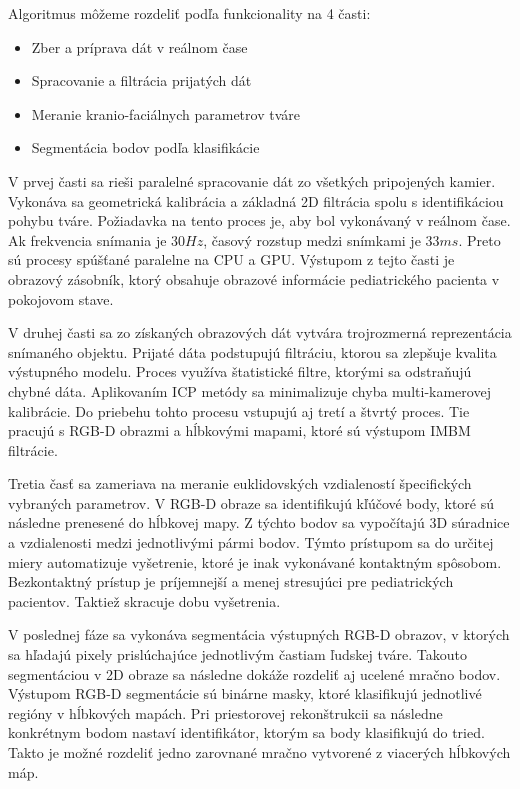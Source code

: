 \noindent Algoritmus môžeme rozdeliť podľa funkcionality na 4 časti: 

\begin{itemize}
	\item Zber a príprava dát v reálnom čase
	\item Spracovanie a filtrácia prijatých dát
	\item Meranie kranio-faciálnych parametrov tváre 
	\item Segmentácia bodov podľa klasifikácie 
\end{itemize}

V prvej časti sa rieši paralelné spracovanie dát zo všetkých pripojených kamier. Vykonáva sa geometrická kalibrácia a základná 2D filtrácia spolu s identifikáciou pohybu tváre. Požiadavka na tento proces je, aby bol vykonávaný v reálnom čase. Ak frekvencia snímania je $30Hz$, časový rozstup medzi snímkami je $33ms$. Preto sú procesy spúšťané paralelne na CPU a GPU. Výstupom z tejto časti je obrazový zásobník, ktorý obsahuje obrazové informácie pediatrického pacienta v pokojovom stave. \newline

V druhej časti sa zo získaných obrazových dát vytvára trojrozmerná reprezentácia snímaného objektu. Prijaté dáta podstupujú filtráciu, ktorou sa zlepšuje kvalita výstupného modelu. Proces využíva štatistické filtre, ktorými sa odstraňujú chybné dáta. Aplikovaním ICP metódy sa minimalizuje chyba multi-kamerovej kalibrácie. Do priebehu tohto procesu vstupujú aj tretí a štvrtý proces. Tie pracujú s RGB-D obrazmi a hĺbkovými mapami, ktoré sú výstupom IMBM filtrácie. \newline

Tretia časť sa zameriava na meranie euklidovských vzdialeností špecifických vybraných parametrov. V RGB-D obraze sa identifikujú kľúčové body, ktoré sú následne prenesené do hĺbkovej mapy. Z týchto bodov sa vypočítajú 3D súradnice a vzdialenosti medzi jednotlivými pármi bodov. Týmto prístupom sa do určitej miery automatizuje vyšetrenie, ktoré je inak vykonávané kontaktným spôsobom. Bezkontaktný prístup je príjemnejší a menej stresujúci pre pediatrických pacientov. Taktiež skracuje dobu vyšetrenia.\newline 

V poslednej fáze sa vykonáva segmentácia výstupných RGB-D obrazov, v ktorých sa hľadajú pixely prislúchajúce jednotlivým častiam ľudskej tváre. Takouto segmentáciou v 2D obraze sa následne dokáže rozdeliť aj ucelené mračno bodov. Výstupom RGB-D segmentácie sú binárne masky, ktoré klasifikujú jednotlivé regióny v hĺbkových mapách. Pri priestorovej rekonštrukcii sa následne konkrétnym bodom nastaví identifikátor, ktorým sa body klasifikujú do tried. Takto je možné rozdeliť jedno zarovnané mračno vytvorené z viacerých hĺbkových máp. \newline

